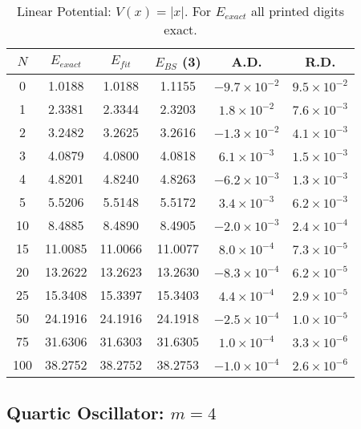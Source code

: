 \documentclass[preprint,preprintnumbers,amsmath,amssymb]{revtex4}
\begin{document}
\begin{table}[h]
	\caption{Linear Potential: $V(x)=|x|$. For $E_{exact}$ all printed digits exact.}
	{\setlength{\tabcolsep}{0.4cm}		
\begin{tabular}{cccccc}
			\hline				
		  $N$ & $E_{exact}$ & $E_{fit}$ & $E_{BS}$ (3) & A.D. & R.D.
\\
			\hline		
			0 & 1.0188  & 1.0188  & 1.1155   & $-9.7\times 10^{-2}$  & $9.5\times10^{-2}$             \\
			1 & 2.3381  & 2.3344  & 2.3203   & $1.8\times 10^{-2}$   & $7.6\times10^{-3}$              \\
			2 & 3.2482  & 3.2625  & 3.2616   & $-1.3\times 10^{-2}$  & $4.1\times10^{-3}$             \\
			3 & 4.0879  & 4.0800  & 4.0818   & $6.1\times 10^{-3}$   & $1.5\times10^{-3}$            \\
			4 & 4.8201  & 4.8240  & 4.8263   & $-6.2\times 10^{-3}$  & $1.3\times10^{-3}$             \\
			5 & 5.5206  & 5.5148  & 5.5172   & $3.4\times 10^{-3}$   & $6.2\times10^{-3}$             \\
		   10 & 8.4885  & 8.4890  & 8.4905   & $-2.0\times 10^{-3}$  & $2.4\times10^{-4}$            \\
	       15 & 11.0085 & 11.0066 & 11.0077  & $8.0\times 10^{-4}$   & $7.3\times10^{-5}$           \\
		   20 & 13.2622 & 13.2623 & 13.2630  & $-8.3\times 10^{-4}$  & $6.2\times10^{-5}$              \\
		   25 & 15.3408 & 15.3397 & 15.3403  & $4.4\times10^{-4}$    & $2.9\times10^{-5}$               \\
		   50 & 24.1916 & 24.1916 & 24.1918  & $-2.5\times10^{-4}$   & $1.0\times10^{-5}$             \\
		   75 & 31.6306 & 31.6303 & 31.6305  & $1.0\times10^{-4}$    & $3.3\times10^{-6}$      \\
		  100 & 38.2752 & 38.2752 & 38.2753  & $-1.0\times10^{-4}$   & $2.6\times10^{-6}$             \\
			\hline				
\end{tabular}
	}
\end{table}

\subsection*{Quartic Oscillator: $m=4$}
\end{document}
